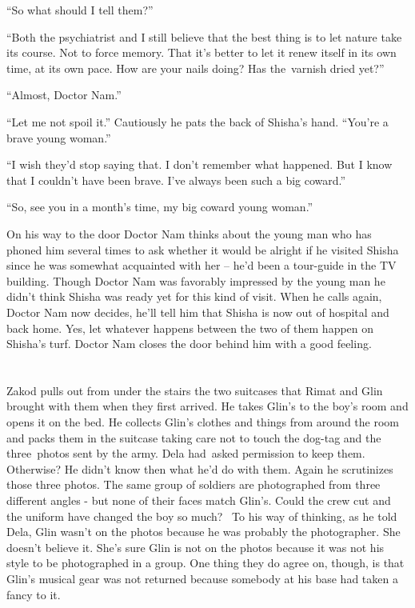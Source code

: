 \documentclass[twoside,11pt]{book}
\begin{document}
``So what should I tell them?''

``Both the psychiatrist and I still believe that the best thing is to let nature take its course. Not to
force memory. That it's better to let it renew itself in its own time, at its own pace. How are your nails doing? Has
the~varnish dried yet?''

``Almost, Doctor Nam.''

``Let me not spoil it.'' Cautiously he pats the back of Shisha's hand. ``You're a
brave young woman.''

``I wish they'd stop saying that. I don't remember what happened. But I know that I couldn't have been
brave. I've always been such a big coward.''

``So, see you in a month's time, my big coward young woman.''

On his way to the door Doctor Nam thinks about the young man who has phoned him several times to ask whether it would be
alright if he visited Shisha since he was somewhat acquainted with her -- he'd been a tour-guide in the TV building.
Though Doctor Nam was favorably impressed by the young man he didn't think Shisha was ready yet for this kind of visit.
When he calls again, Doctor Nam now decides, he'll tell him that Shisha is now out of hospital and back home. Yes, let
whatever happens between the two of them happen on Shisha's turf. Doctor Nam closes the door behind him with a good
feeling.


\bigskip

\chapter{}

Zakod pulls out from under the stairs the two suitcases that Rimat and Glin brought with them when they first arrived.
He takes Glin's to the boy's room and opens it on the bed. He collects Glin's clothes and things from around the room
and packs them in the suitcase taking care not to touch the dog-tag and the three~photos sent by the army. Dela
had~asked permission to keep them. Otherwise? He didn't know then what he'd do with them. Again he scrutinizes those
three photos. The same group of soldiers are photographed from three different angles - but none of their faces match
Glin's. Could the crew cut and the uniform have changed the boy so much? \ To his way of thinking, as he told Dela,
Glin wasn't on the photos because he was probably the photographer. She doesn't believe it. She's sure Glin is not on
the photos because it was not his style to be photographed in a group. One thing they do agree on, though, is that
Glin's musical gear was not returned because somebody at his base had taken a fancy to it.
\end{document}
